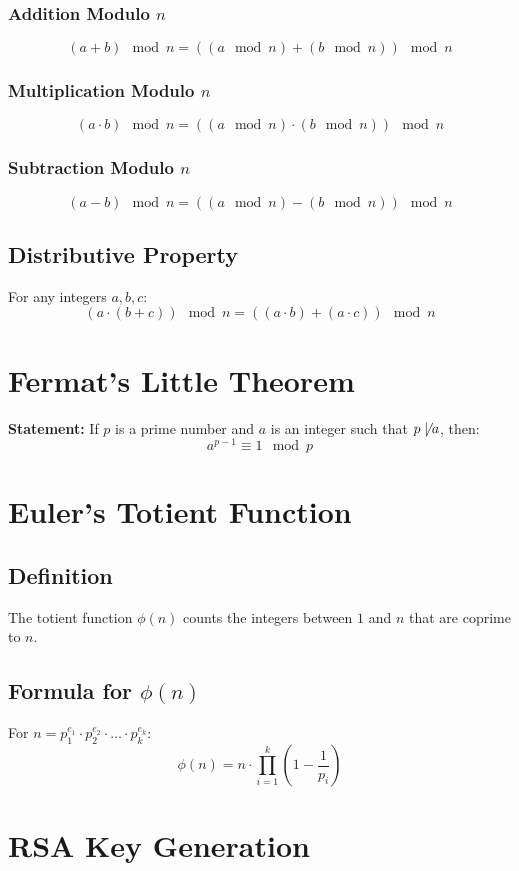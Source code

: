 \documentclass[12pt]{article}
\begin{document}
\subsubsection*{Addition Modulo \( n \)}
\[
(a + b) \mod n = ((a \mod n) + (b \mod n)) \mod n
\]

\subsubsection*{Multiplication Modulo \( n \)}
\[
(a \cdot b) \mod n = ((a \mod n) \cdot (b \mod n)) \mod n
\]

\subsubsection*{Subtraction Modulo \( n \)}
\[
(a - b) \mod n = ((a \mod n) - (b \mod n)) \mod n
\]

\subsection*{Distributive Property}
For any integers \( a, b, c \):
\[
(a \cdot (b + c)) \mod n = ((a \cdot b) + (a \cdot c)) \mod n
\]

\section*{Fermat's Little Theorem}
\textbf{Statement:} If \( p \) is a prime number and \( a \) is an integer such that \( p \not\mid a \), then:
\[
a^{p-1} \equiv 1 \mod p
\]

\section*{Euler's Totient Function}
\subsection*{Definition}
The totient function \( \phi(n) \) counts the integers between \( 1 \) and \( n \) that are coprime to \( n \).

\subsection*{Formula for \( \phi(n) \)}
For \( n = p_1^{e_1} \cdot p_2^{e_2} \cdot \dots \cdot p_k^{e_k} \):
\[
\phi(n) = n \cdot \prod_{i=1}^{k} \left(1 - \frac{1}{p_i}\right)
\]

\section*{RSA Key Generation}
\end{document}
